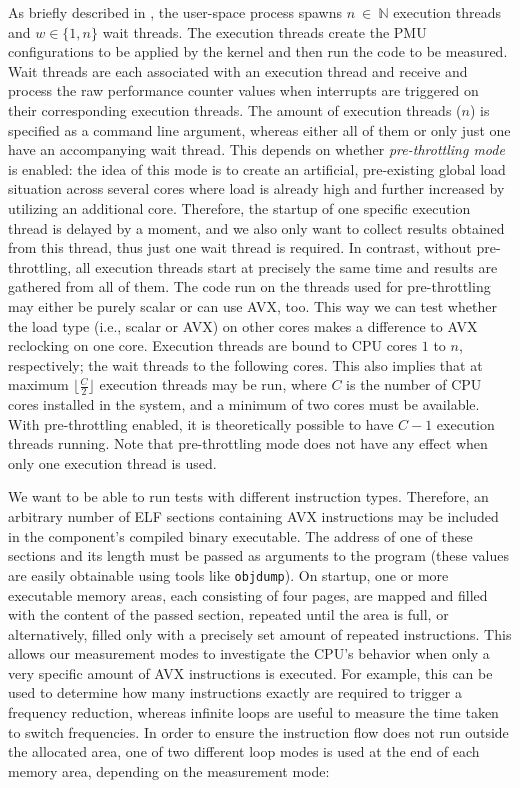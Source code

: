 As briefly described in , the user-space process spawns $n~\in~\mathbb{N}$ execution threads and $w\in\{1,n\}$ wait threads. The execution threads create the \gls{PMU} configurations to be applied by the kernel and then run the code to be measured. Wait threads are each associated with an execution thread and receive and process the raw performance counter values when interrupts are triggered on their corresponding execution threads. The amount of execution threads ($n$) is specified as a command line argument, whereas either all of them or only just one have an accompanying wait thread. This depends on whether \emph{pre-throttling mode} is enabled: the idea of this mode is to create an artificial, pre-existing global load situation across several cores where load is already high and further increased by utilizing an additional core. Therefore, the startup of one specific execution thread is delayed by a moment, and we also only want to collect results obtained from this thread, thus just one wait thread is required. In contrast, without pre-throttling, all execution threads start at precisely the same time and results are gathered from all of them. The code run on the threads used for pre-throttling may either be purely scalar or can use \gls{AVX}, too. This way we can test whether the load type (i.e., scalar or \gls{AVX}) on other cores makes a difference to \gls{AVX} reclocking on one core. Execution threads are bound to \gls{CPU} cores $1$ to $n$, respectively; the wait threads to the following cores. This also implies that at maximum $\lfloor{}\frac{C}{2}\rfloor{}$ execution threads may be run, where $C$ is the number of \gls{CPU} cores installed in the system, and a minimum of two cores must be available. With pre-throttling enabled, it is theoretically possible to have $C-1$ execution threads running. Note that pre-throttling mode does not have any effect when only one execution thread is used.

We want to be able to run tests with different instruction types. Therefore, an arbitrary number of \gls{ELF} sections containing \gls{AVX} instructions may be included in the component's compiled binary executable. The address of one of these sections and its length must be passed as arguments to the program (these values are easily obtainable using tools like \texttt{objdump}). On startup, one or more executable memory areas, each consisting of four pages, are mapped and filled with the content of the passed section, repeated until the area is full, or alternatively, filled only with a precisely set amount of repeated instructions. This allows our measurement modes to investigate the \gls{CPU}'s behavior when only a very specific amount of \gls{AVX} instructions is executed. For example, this can be used to determine how many instructions exactly are required to trigger a frequency reduction, whereas infinite loops are useful to measure the time taken to switch frequencies. In order to ensure the instruction flow does not run outside the allocated area, one of two different loop modes is used at the end of each memory area, depending on the measurement mode:

